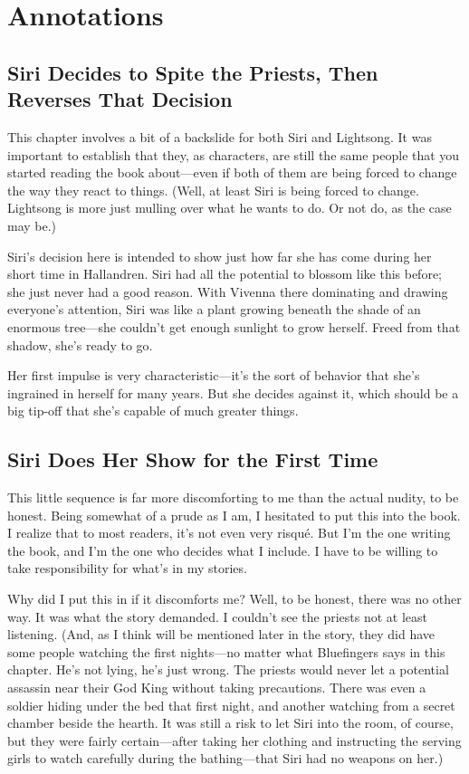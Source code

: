 \section*{Annotations}

\subsection*{Siri Decides to Spite the Priests, Then Reverses That Decision}

This chapter involves a bit of a backslide for both Siri and Lightsong. It was important to establish that they, as characters, are still the same people that you started reading the book about—even if both of them are being forced to change the way they react to things. (Well, at least Siri is being forced to change. Lightsong is more just mulling over what he wants to do. Or not do, as the case may be.)

Siri’s decision here is intended to show just how far she has come during her short time in Hallandren. Siri had all the potential to blossom like this before; she just never had a good reason. With Vivenna there dominating and drawing everyone’s attention, Siri was like a plant growing beneath the shade of an enormous tree—she couldn’t get enough sunlight to grow herself. Freed from that shadow, she’s ready to go.

Her first impulse is very characteristic—it’s the sort of behavior that she’s ingrained in herself for many years. But she decides against it, which should be a big tip-off that she’s capable of much greater things.

\subsection*{Siri Does Her Show for the First Time}

This little sequence is far more discomforting to me than the actual nudity, to be honest. Being somewhat of a prude as I am, I hesitated to put this into the book. I realize that to most readers, it’s not even very risqué. But I’m the one writing the book, and I’m the one who decides what I include. I have to be willing to take responsibility for what’s in my stories.

Why did I put this in if it discomforts me? Well, to be honest, there was no other way. It was what the story demanded. I couldn’t see the priests not at least listening. (And, as I think will be mentioned later in the story, they did have some people watching the first nights—no matter what Bluefingers says in this chapter. He’s not lying, he’s just wrong. The priests would never let a potential assassin near their God King without taking precautions. There was even a soldier hiding under the bed that first night, and another watching from a secret chamber beside the hearth. It was still a risk to let Siri into the room, of course, but they were fairly certain—after taking her clothing and instructing the serving girls to watch carefully during the bathing—that Siri had no weapons on her.)

